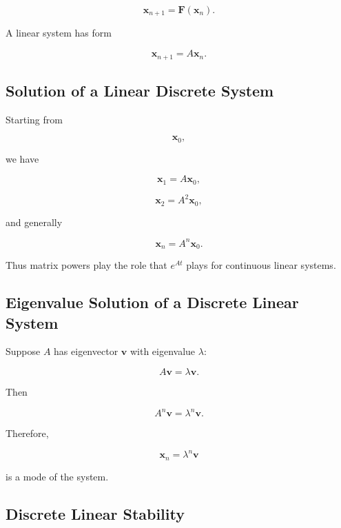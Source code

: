 \[
\boxed{
\mathbf{x}_{n+1}
=
\mathbf{F}(\mathbf{x}_n).
}
\]

A linear system has form

\[
\boxed{
\mathbf{x}_{n+1}
=
A\mathbf{x}_n.
}
\]

\subsection{Solution of a Linear Discrete System}
\label{subsec:linear-discrete-system-solution}

Starting from

\[
\mathbf{x}_0,
\]

we have

\[
\mathbf{x}_1=A\mathbf{x}_0,
\]

\[
\mathbf{x}_2=A^2\mathbf{x}_0,
\]

and generally

\[
\boxed{
\mathbf{x}_n
=
A^n\mathbf{x}_0.
}
\]

Thus matrix powers play the role that \(e^{At}\) plays for continuous
linear systems.

\subsection{Eigenvalue Solution of a Discrete Linear System}
\label{subsec:eigenvalue-discrete-system}

Suppose \(A\) has eigenvector \(\mathbf{v}\) with eigenvalue \(\lambda\):

\[
A\mathbf{v}
=
\lambda\mathbf{v}.
\]

Then

\[
A^n\mathbf{v}
=
\lambda^n\mathbf{v}.
\]

Therefore,

\[
\boxed{
\mathbf{x}_n
=
\lambda^n\mathbf{v}
}
\]

is a mode of the system.

\subsection{Discrete Linear Stability}
\label{subsec:discrete-linear-stability}

